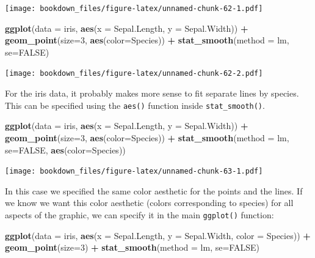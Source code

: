 \documentclass[]{krantz}
\makeatletter
\newenvironment{Shaded}{\begin{snugshade}}{\end{snugshade}}
\newcommand{\KeywordTok}[1]{\textcolor[rgb]{0.27,0.27,0.27}{\textbf{#1}}}
\newcommand{\DataTypeTok}[1]{\textcolor[rgb]{0.27,0.27,0.27}{#1}}
\newcommand{\DecValTok}[1]{\textcolor[rgb]{0.06,0.06,0.06}{#1}}
\newcommand{\StringTok}[1]{\textcolor[rgb]{0.5,0.5,0.5}{#1}}
\newcommand{\OtherTok}[1]{\textcolor[rgb]{0.37,0.37,0.37}{#1}}
\newcommand{\OperatorTok}[1]{\textcolor[rgb]{0.43,0.43,0.43}{\textbf{#1}}}
\newcommand{\NormalTok}[1]{#1}
\newenvironment{kframe}{%
\medskip{}
\setlength{\fboxsep}{.8em}
 \def\at@end@of@kframe{}%
 \ifinner\ifhmode%
  \def\at@end@of@kframe{\end{minipage}}%
  \begin{minipage}{\columnwidth}%
 \fi\fi%
 \def\FrameCommand##1{\hskip\@totalleftmargin \hskip-\fboxsep
 \colorbox{shadecolor}{##1}\hskip-\fboxsep
     \hskip-\linewidth \hskip-\@totalleftmargin \hskip\columnwidth}%
 \MakeFramed {\advance\hsize-\width
   \@totalleftmargin\z@ \linewidth\hsize
   \@setminipage}}%
 {\par\unskip\endMakeFramed%
 \at@end@of@kframe}
\renewenvironment{Shaded}{\begin{kframe}}{\end{kframe}}
\makeatother
\begin{document}
\texttt{[image: bookdown\_files/figure-latex/unnamed-chunk-62-1.pdf]}

\begin{Shaded}
\begin{Highlighting}[]
\KeywordTok{ggplot}\NormalTok{(}\DataTypeTok{data =}\NormalTok{ iris, }\KeywordTok{aes}\NormalTok{(}\DataTypeTok{x =}\NormalTok{ Sepal.Length, }\DataTypeTok{y =}\NormalTok{ Sepal.Width)) }\OperatorTok{+}\StringTok{ }
\StringTok{    }\KeywordTok{geom_point}\NormalTok{(}\DataTypeTok{size=}\DecValTok{3}\NormalTok{, }\KeywordTok{aes}\NormalTok{(}\DataTypeTok{color=}\NormalTok{Species)) }\OperatorTok{+}\StringTok{ }
\StringTok{    }\KeywordTok{stat_smooth}\NormalTok{(}\DataTypeTok{method =}\NormalTok{ lm, }\DataTypeTok{se=}\OtherTok{FALSE}\NormalTok{)}
\end{Highlighting}
\end{Shaded}

\texttt{[image: bookdown\_files/figure-latex/unnamed-chunk-62-2.pdf]}

For the iris data, it probably makes more sense to fit separate lines by
species. This can be specified using the \texttt{aes()} function inside
\texttt{stat\_smooth()}.

\begin{Shaded}
\begin{Highlighting}[]
\KeywordTok{ggplot}\NormalTok{(}\DataTypeTok{data =}\NormalTok{ iris, }\KeywordTok{aes}\NormalTok{(}\DataTypeTok{x =}\NormalTok{ Sepal.Length, }\DataTypeTok{y =}\NormalTok{ Sepal.Width)) }\OperatorTok{+}\StringTok{ }
\StringTok{    }\KeywordTok{geom_point}\NormalTok{(}\DataTypeTok{size=}\DecValTok{3}\NormalTok{, }\KeywordTok{aes}\NormalTok{(}\DataTypeTok{color=}\NormalTok{Species)) }\OperatorTok{+}\StringTok{ }
\StringTok{    }\KeywordTok{stat_smooth}\NormalTok{(}\DataTypeTok{method =}\NormalTok{ lm, }\DataTypeTok{se=}\OtherTok{FALSE}\NormalTok{, }\KeywordTok{aes}\NormalTok{(}\DataTypeTok{color=}\NormalTok{Species))}
\end{Highlighting}
\end{Shaded}

\texttt{[image: bookdown\_files/figure-latex/unnamed-chunk-63-1.pdf]}

In this case we specified the same color aesthetic for the points and
the lines. If we know we want this color aesthetic (colors corresponding
to species) for all aspects of the graphic, we can specify it in the
main \texttt{ggplot()} function:

\begin{Shaded}
\begin{Highlighting}[]
\KeywordTok{ggplot}\NormalTok{(}\DataTypeTok{data =}\NormalTok{ iris, }\KeywordTok{aes}\NormalTok{(}\DataTypeTok{x =}\NormalTok{ Sepal.Length, }\DataTypeTok{y =}\NormalTok{ Sepal.Width, }\DataTypeTok{color =}\NormalTok{ Species)) }\OperatorTok{+}\StringTok{ }
\StringTok{    }\KeywordTok{geom_point}\NormalTok{(}\DataTypeTok{size=}\DecValTok{3}\NormalTok{) }\OperatorTok{+}\StringTok{ }\KeywordTok{stat_smooth}\NormalTok{(}\DataTypeTok{method =}\NormalTok{ lm, }\DataTypeTok{se=}\OtherTok{FALSE}\NormalTok{)}
\end{Highlighting}
\end{Shaded}
\end{document}
